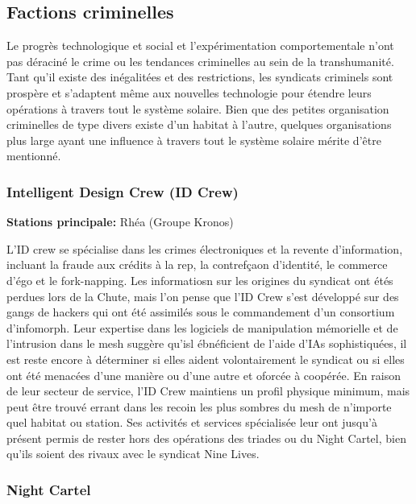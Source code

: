 \subsection{Factions criminelles} \label{sec:criminal-factions} 

Le progrès technologique et social et l'expérimentation comportementale n'ont pas déraciné le crime ou les tendances criminelles au sein de la transhumanité. Tant qu'il existe des inégalitées et des restrictions, les syndicats criminels sont prospère et s'adaptent même aux nouvelles technologie pour étendre leurs opérations à travers tout le système solaire. Bien que des petites organisation criminelles de type divers existe d'un habitat à l'autre, quelques organisations plus large ayant une influence à travers tout le système solaire mérite d'être mentionné. 

\subsubsection{Intelligent Design Crew (ID Crew)} \label{sec:intell-design-crew} 

\textbf{Stations principale:} Rhéa (Groupe Kronos) 

L'ID crew se spécialise dans les crimes électroniques et la revente d'information, incluant la fraude aux crédits à la rep, la contrefçaon d'identité, le commerce d'égo et le fork-napping. Les informatiosn sur les origines du syndicat ont étés perdues lors de la Chute, mais l'on pense que l'ID Crew s'est développé sur des gangs de hackers qui ont été assimilés sous le commandement d'un consortium d'infomorph. Leur expertise dans les logiciels de manipulation mémorielle et de l'intrusion dans le mesh suggère qu'isl ébnéficient de l'aide d'IAs sophistiquées, il est reste encore à déterminer si elles aident volontairement le syndicat ou si elles ont été menacées d'une manière ou d'une autre et oforcée à coopérée. En raison de leur secteur de service, l'ID Crew maintiens un profil physique minimum, mais peut être trouvé errant dans les recoin les plus sombres du mesh de n'importe quel habitat ou station. Ses activités et services spécialisée leur ont jusqu'à présent permis de rester hors des opérations des triades ou du Night Cartel, bien qu'ils soient des rivaux avec le syndicat Nine Lives. 

\subsubsection{Night Cartel} \label{sec:night-cartel} 

